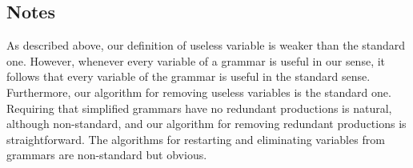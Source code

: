 \subsection{Notes}

As described above, our definition of useless variable is weaker than
the standard one.  However, whenever every variable of a grammar is
useful in our sense, it follows that every variable of the grammar is
useful in the standard sense.  Furthermore, our algorithm for removing
useless variables is the standard one.  Requiring that simplified
grammars have no redundant productions is natural, although
non-standard, and our algorithm for removing redundant productions is
straightforward. The algorithms for restarting and eliminating
variables from grammars are non-standard but obvious.

